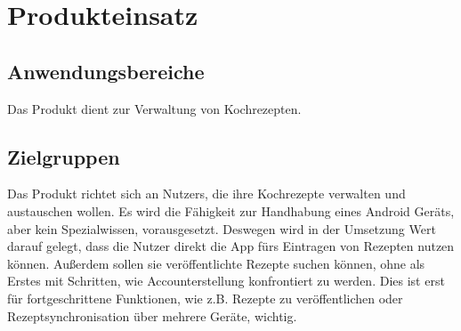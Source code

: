 
\chapter{Produkteinsatz}
\section{Anwendungsbereiche}

Das Produkt dient zur Verwaltung von Kochrezepten.


\section{Zielgruppen} 
Das Produkt richtet sich an \glspl{Nutzer}, die ihre Kochrezepte verwalten und austauschen wollen. Es wird die Fähigkeit zur Handhabung eines \gls{Android} Geräts, aber kein Spezialwissen, vorausgesetzt. Deswegen wird in der Umsetzung Wert darauf gelegt, dass die Nutzer direkt die App fürs Eintragen von Rezepten nutzen können. Außerdem sollen sie veröffentlichte Rezepte suchen können, ohne als Erstes mit Schritten, wie Accounterstellung konfrontiert zu werden. Dies ist erst für fortgeschrittene Funktionen, wie z.B. Rezepte zu veröffentlichen oder Rezeptsynchronisation über mehrere Geräte, wichtig. 
